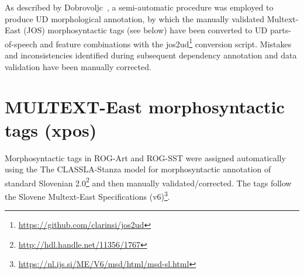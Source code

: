 \documentclass[a4paper,oneside,12pt]{article}
\begin{document}
As described by Dobrovoljc~\cite{dobrovoljc2024extending}, a semi-automatic
procedure was employed to produce UD morphological annotation, by which the
manually validated Multext-East (JOS) morphosyntactic tags (see below) have been
converted to UD parts-of-speech and feature combinations with the
jos2ud\footnote{\url{https://github.com/clarinsi/jos2ud}} conversion script.
Mistakes and inconsistencies identified during subsequent dependency annotation
and data validation have been manually corrected.


\section{MULTEXT-East morphosyntactic tags (xpos)}

Morphosyntactic tags in ROG-Art and ROG-SST were assigned automatically using
the The CLASSLA-Stanza model for morphosyntactic annotation of standard
Slovenian 2.0\footnote{\url{http://hdl.handle.net/11356/1767}} and then manually
validated/corrected. The tags follow the Slovene Multext-East Specifications
(v6)\footnote{\url{https://nl.ijs.si/ME/V6/msd/html/msd-sl.html}}.
\end{document}
